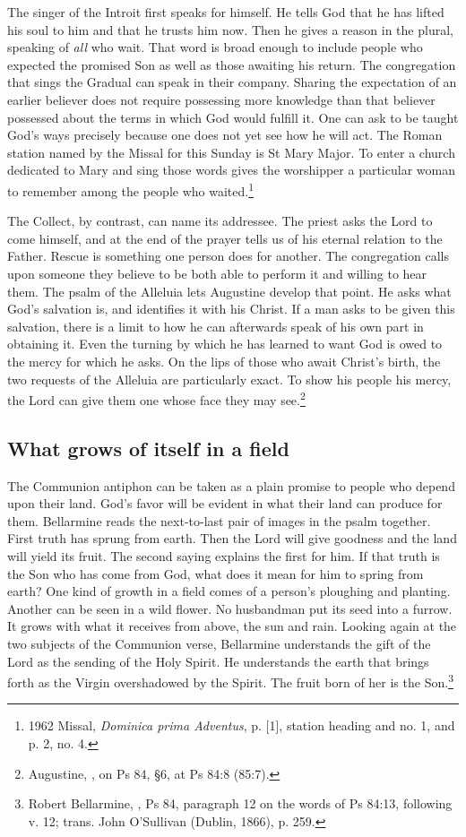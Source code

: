 The singer of the Introit first speaks for himself. He tells God that he has lifted his soul to him and that he trusts him now. Then he gives a reason in the plural, speaking of \emph{all} who wait. That word is broad enough to include people who expected the promised Son as well as those awaiting his return. The congregation that sings the Gradual can speak in their company. Sharing the expectation of an earlier believer does not require possessing more knowledge than that believer possessed about the terms in which God would fulfill it. One can ask to be taught God's ways precisely because one does not yet see how he will act. The Roman station named by the Missal for this Sunday is St Mary Major. To enter a church dedicated to Mary and sing those words gives the worshipper a particular woman to remember among the people who waited.\footnote{1962 Missal, \emph{Dominica prima Adventus}, p. [1], station heading and no. 1, and p. 2, no. 4.}

The Collect, by contrast, can name its addressee. The priest asks the Lord to come himself, and at the end of the prayer tells us of his eternal relation to the Father. Rescue is something one person does for another. The congregation calls upon someone they believe to be both able to perform it and willing to hear them. The psalm of the Alleluia lets Augustine develop that point. He asks what God's salvation is, and identifies it with his Christ. If a man asks to be given this salvation, there is a limit to how he can afterwards speak of his own part in obtaining it. Even the turning by which he has learned to want God is owed to the mercy for which he asks. On the lips of those who await Christ's birth, the two requests of the Alleluia are particularly exact. To show his people his mercy, the Lord can give them one whose face they may see.\footnote{Augustine, , on Ps 84, §6, at Ps 84:8 (85:7).}

\subsection{What grows of itself in a field}

The Communion antiphon can be taken as a plain promise to people who depend upon their land. God's favor will be evident in what their land can produce for them. Bellarmine reads the next-to-last pair of images in the psalm together. First truth has sprung from earth. Then the Lord will give goodness and the land will yield its fruit. The second saying explains the first for him. If that truth is the Son who has come from God, what does it mean for him to spring from earth? One kind of growth in a field comes of a person's ploughing and planting. Another can be seen in a wild flower. No husbandman put its seed into a furrow. It grows with what it receives from above, the sun and rain. Looking again at the two subjects of the Communion verse, Bellarmine understands the gift of the Lord as the sending of the Holy Spirit. He understands the earth that brings forth as the Virgin overshadowed by the Spirit. The fruit born of her is the Son.\footnote{Robert Bellarmine, , Ps 84, paragraph 12 on the words of Ps 84:13, following v. 12; trans. John O'Sullivan (Dublin, 1866), p. 259.}


